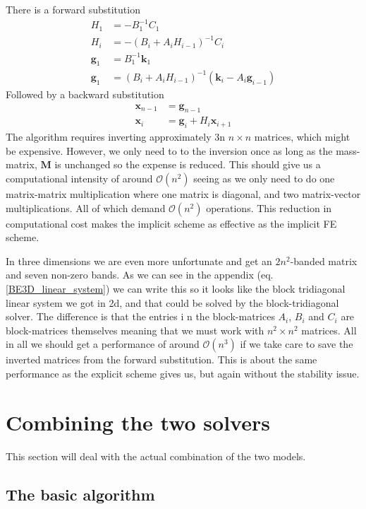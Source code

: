 There is a forward substitution
\begin{align*}
 H_1 &= -B_1^{-1}C_1\nonumber \\
 H_i &= -\left(B_i+A_iH_{i-1}\right)^{-1}C_i \nonumber \\
 \mathbf{g}_1 &= B_1^{-1}\mathbf{k}_1 \nonumber\\
 \mathbf{g}_1 &= \left(B_i+A_iH_{i-1}\right)^{-1}\left(\mathbf{k}_i-A_i\mathbf{g}_{i-1}\right)\nonumber
 \end{align*}
 Followed by a backward substitution
 \begin{align*}
  \mathbf{x}_{n-1} &= \mathbf{g}_{n-1}\nonumber\\
  \mathbf{x}_i &= \mathbf{g}_i + H_i\mathbf{x}_{i+1} \nonumber
 \end{align*}
The algorithm requires inverting approximately 3n $n\times n$ matrices, which might be expensive. 
However, we only need to to the inversion once as long as the mass-matrix, $\mathbf M$ is unchanged so the expense is reduced. 
This should give us a computational intensity of around $\mathcal{O}(n^2)$ seeing as we only need to do one matrix-matrix multiplication where one matrix is diagonal, and two matrix-vector multiplications. 
All of which demand $\mathcal{O}(n^2)$ operations. This reduction in computational cost makes the implicit scheme as effective as the implicit FE scheme.

In three dimensions we are even more unfortunate and get an $2n^2$-banded matrix and seven non-zero bands. 
As we can see in the appendix (eq. \ref{BE3D_linear_system}) we can write this so it looks like the block tridiagonal linear system we got in 2d, and that could be solved by the block-tridiagonal solver. 
The difference is that the entries i n the block-matrices $A_i$, $B_i$ and $C_i$ are block-matrices themselves meaning that we must work with $n^2\times n^2$ matrices. 
All in all we should get a performance of around $\mathcal{O}(n^3)$ if we take care to save the inverted matrices from the forward substitution. 
This is about the same performance as the explicit scheme gives us, but again without the stability issue.

\section{Combining the two solvers}\label{combining_the_solvers}
This section will deal with the actual combination of the two models.\\

\subsection{The basic algorithm}\label{basic_algorithm}

